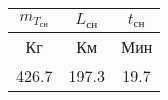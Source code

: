 \begin{tabular}{|c|c|c|}
\hline
$m_{T_{сн}}$ & $L_{сн}$ & $t_{сн}$ \\ 
\hline
Кг & Км & Мин \\ 
\hline
426.7 & 197.3 & 19.7 \\ 
\hline
\end{tabular}